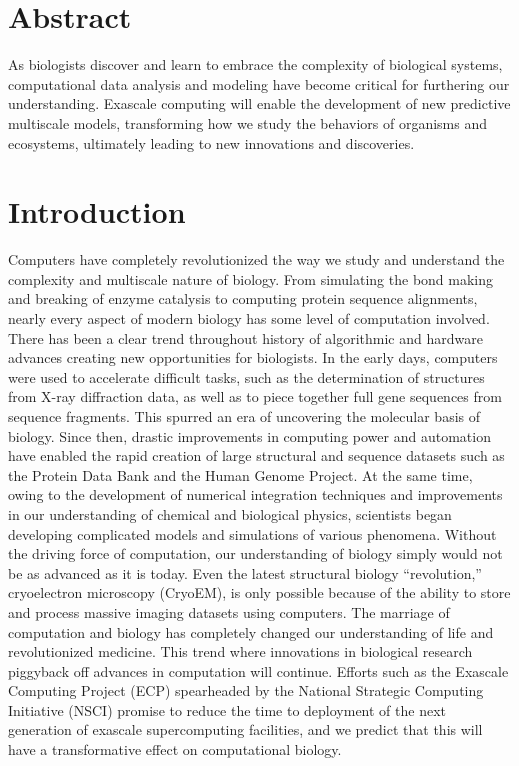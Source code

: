 
\section{Abstract}
\par As biologists discover and learn to embrace the complexity of biological systems, computational data analysis and modeling have become critical for furthering our understanding. Exascale computing will enable the development of new predictive multiscale models, transforming how we study the behaviors of organisms and ecosystems, ultimately leading to new innovations and discoveries.

\section{Introduction}
\par Computers have completely revolutionized the way we study and understand the complexity and multiscale nature of biology. From simulating the bond making and breaking of enzyme catalysis to computing protein sequence alignments, nearly every aspect of modern biology has some level of computation involved. There has been a clear trend throughout history of algorithmic and hardware advances creating new opportunities for biologists. In the early days, computers were used to accelerate difficult tasks, such as the determination of structures from X-ray diffraction data, as well as to piece together full gene sequences from sequence fragments. This spurred an era of uncovering the molecular basis of biology. Since then, drastic improvements in computing power and automation have enabled the rapid creation of large structural and sequence datasets such as the Protein Data Bank and the Human Genome Project\cite{Berman2000,InternationalHumanGenomeSequencingConsortium2004}. At the same time, owing to the development of numerical integration techniques and improvements in our understanding of chemical and biological physics, scientists began developing complicated models and simulations of various phenomena. Without the driving force of computation, our understanding of biology simply would not be as advanced as it is today. Even the latest structural biology ``revolution,'' cryoelectron microscopy (CryoEM), is only possible because of the ability to store and process massive imaging datasets using computers\cite{Callaway2015a}. The marriage of computation and biology has completely changed our understanding of life and revolutionized medicine. This trend where innovations in biological research piggyback off advances in computation will continue. Efforts such as the Exascale Computing Project (ECP) spearheaded by the National Strategic Computing Initiative (NSCI) promise to reduce the time to deployment of the next generation of exascale supercomputing facilities, and we predict that this will have a transformative effect on computational biology.

